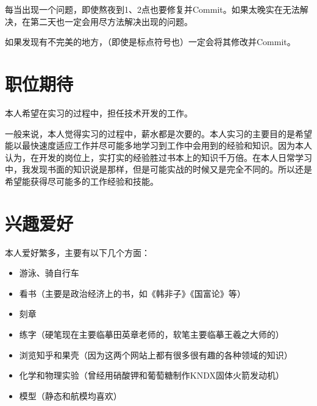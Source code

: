 \documentclass[UTF8]{ctexart}
\begin{document}
每当出现一个问题，即使熬夜到1、2点也要修复并Commit。如果太晚实在无法解决，在第二天也一定会用尽方法解决出现的问题。

如果发现有不完美的地方，（即使是标点符号也）一定会将其修改并Commit。
\section{职位期待}

本人希望在实习的过程中，担任技术开发的工作。

一般来说，本人觉得实习的过程中，薪水都是次要的。本人实习的主要目的是希望能以最快速度适应工作并尽可能多地学习到工作中会用到的经验和知识。因为本人认为，在开发的岗位上，实打实的经验胜过书本上的知识千万倍。在本人日常学习中，我发现书面的知识说是那样，但是可能实战的时候又是完全不同的。所以还是希望能获得尽可能多的工作经验和技能。
\section{兴趣爱好}
本人爱好繁多，主要有以下几个方面：
\begin{itemize}
\item 游泳、骑自行车
\item 看书（主要是政治经济上的书，如《韩非子》《国富论》等）
\item 刻章
\item 练字（硬笔现在主要临摹田英章老师的，软笔主要临摹王羲之大师的）
\item 浏览知乎和果壳（因为这两个网站上都有很多很有趣的各种领域的知识）
\item 化学和物理实验（曾经用硝酸钾和葡萄糖制作KNDX固体火箭发动机）
\item 模型（静态和航模均喜欢）
\end{itemize}
\end{document}
